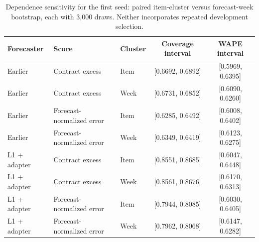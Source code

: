 \begin{table}[t]
\centering\small
\caption{Dependence sensitivity for the first seed: paired item-cluster versus forecast-week bootstrap, each with 3,000 draws. Neither incorporates repeated development selection.}
\label{tab:week}
\begin{tabular}{lllcc}
\toprule
Forecaster & Score & Cluster & Coverage interval & WAPE interval\\
\midrule
Earlier & Contract excess & Item & [0.6692, 0.6892] & [0.5969, 0.6395]\\
Earlier & Contract excess & Week & [0.6731, 0.6852] & [0.6090, 0.6260]\\
Earlier & Forecast-normalized error & Item & [0.6285, 0.6492] & [0.6008, 0.6402]\\
Earlier & Forecast-normalized error & Week & [0.6349, 0.6419] & [0.6123, 0.6275]\\
L1 + adapter & Contract excess & Item & [0.8551, 0.8685] & [0.6047, 0.6448]\\
L1 + adapter & Contract excess & Week & [0.8561, 0.8676] & [0.6170, 0.6313]\\
L1 + adapter & Forecast-normalized error & Item & [0.7944, 0.8085] & [0.6030, 0.6405]\\
L1 + adapter & Forecast-normalized error & Week & [0.7962, 0.8068] & [0.6147, 0.6282]\\
\bottomrule
\end{tabular}
\end{table}
